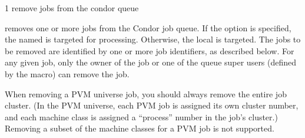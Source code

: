 \begin{ManPage}{\label{man-condor-rm}}{1}
{remove jobs from the condor queue}
\Synopsis {}
\ToolArgsBase
\ToolArgsLocate
{}


\Description

 removes one or more jobs from the Condor job queue.  
If the  option is specified, the named  is targeted
for processing.  
Otherwise, the local  is targeted.
The jobs to be removed are identified by one or more job identifiers, as
described below.
For any given job, only the owner of the job or one of the queue super users
(defined by the  macro) can remove the job.

\begin{Options}
	\ToolArgsBaseDesc
	\ToolArgsLocateDesc
\end{Options}

\GenRem

When removing a PVM universe job, you should always remove the entire
job cluster.  (In the PVM universe, each PVM job is assigned its own
cluster number, and each machine class is assigned a ``process''
number in the job's cluster.)  Removing a subset of the machine
classes for a PVM job is not supported.

\end{ManPage}
